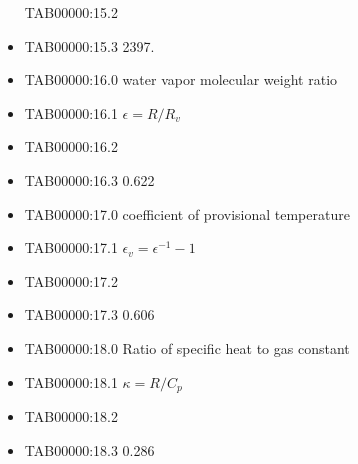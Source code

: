 \begin{itemize}
  TAB00000:15.2
\item
  TAB00000:15.3 2397.
\item
  TAB00000:16.0 water vapor molecular weight ratio
\item
  TAB00000:16.1 \(\epsilon = R/R_v\)
\item
  TAB00000:16.2
\item
  TAB00000:16.3 0.622
\item
  TAB00000:17.0 coefficient of provisional temperature
\item
  TAB00000:17.1 \(\epsilon_v = \epsilon^{-1} - 1\)
\item
  TAB00000:17.2
\item
  TAB00000:17.3 0.606
\item
  TAB00000:18.0 Ratio of specific heat to gas constant
\item
  TAB00000:18.1 \(\kappa = R/C_p\)
\item
  TAB00000:18.2
\item
  TAB00000:18.3 0.286
\end{itemize}
